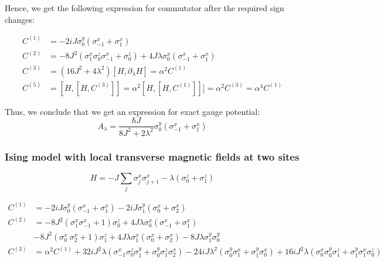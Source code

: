 \documentclass[11pt,a4paper]{article}
\begin{document}
Hence, we get the following  expression for commutator after the required sign changes:


\begin{align*}
C^{(1)}&= -2 i J \sigma_0^y ( \sigma_{-1}^x + \sigma_1^x) \\ 
C^{(2)}&= - 8 J^2(\sigma^x_1 \sigma^z_0 \sigma^x_{-1} + \sigma^z_0) + 4J \lambda \sigma_0^x( \sigma_{-1}^x + \sigma_1^x) \\
C^{(3)} &=  (16 J^2 + 4 \lambda ^2) [H, \partial_{\lambda} H] = \alpha^2  C^{(1)} \\
C^{(5)}&=[H,[H, C^{(3)}]]  = \alpha^2 [H, [H,C^{(1)}]]]=\alpha^2 C^{(3)}=  \alpha^4 C^{(1)}   
\end{align*}

Thus, we conclude that we get an expression for exact gauge potential:
\begin{equation}
\boxed{ A_{\lambda} = \dfrac{\hbar J}{{8 J^2 + 2 \lambda ^2 }} \sigma_0^y ( \sigma_{-1}^x + \sigma_1^x)}
\end{equation}

\subsubsection*{Ising model with local transverse magnetic fields at two sites}


\begin{equation}
H= -J \sum_{j}  \sigma_j^x \sigma_{j+1}^x -  \lambda  (\sigma_0^z+ \sigma_1^z) 
\label{xx}
\end{equation}

\begin{align*}
C^{(1)}&= -2 i J \sigma_0^y ( \sigma_{-1}^x + \sigma_1^x)  -2 i J \sigma_1^y ( \sigma_{0}^x + \sigma_2^x) \\ 
C^{(2)}&= - 8 J^2(\sigma^x_1 \sigma^x_{-1} +1) \sigma^z_0 + 4J \lambda \sigma_0^x( \sigma_{-1}^x + \sigma_1^x) \\
& - 8 J^2(\sigma^x_0 \ \sigma^x_{2}+1)  \sigma^z_1 + 4J \lambda \sigma_1^x( \sigma_{0}^x + \sigma_2^x)- 8 J \lambda \sigma_1^y \sigma_0^y\\
C^{(3)} &=   \alpha^2  C^{(1)} + 32i J^2 \lambda (\sigma^x_{-1} \sigma^z_0 \sigma^y_1   + \sigma^y_{0} \sigma^z_1 \sigma^x_2) -24 i J \lambda^2 (\sigma^y_{0} \sigma^x_1+ \sigma^y_{1} \sigma^x_0)  + 16 i J^2 \lambda (\sigma^x_{0} \sigma^y_0 \sigma^z_1   + \sigma^y_{1} \sigma^x_1 \sigma^z_0)
\end{align*}
\end{document}
